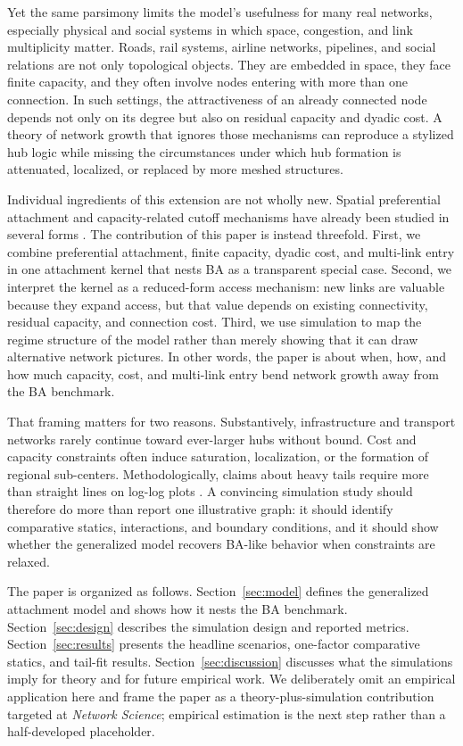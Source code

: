 \documentclass[11pt]{article}
\begin{document}
Yet the same parsimony limits the model's usefulness for many real networks, especially physical and social systems in which space, congestion, and link multiplicity matter. Roads, rail systems, airline networks, pipelines, and social relations are not only topological objects. They are embedded in space, they face finite capacity, and they often involve nodes entering with more than one connection. In such settings, the attractiveness of an already connected node depends not only on its degree but also on residual capacity and dyadic cost. A theory of network growth that ignores those mechanisms can reproduce a stylized hub logic while missing the circumstances under which hub formation is attenuated, localized, or replaced by more meshed structures.

Individual ingredients of this extension are not wholly new. Spatial preferential attachment and capacity-related cutoff mechanisms have already been studied in several forms \citep{barthelemy2011spatial,bianconi2001competition,krapivsky2001organization}. The contribution of this paper is instead threefold. First, we combine preferential attachment, finite capacity, dyadic cost, and multi-link entry in one attachment kernel that nests BA as a transparent special case. Second, we interpret the kernel as a reduced-form access mechanism: new links are valuable because they expand access, but that value depends on existing connectivity, residual capacity, and connection cost. Third, we use simulation to map the regime structure of the model rather than merely showing that it can draw alternative network pictures. In other words, the paper is about when, how, and how much capacity, cost, and multi-link entry bend network growth away from the BA benchmark.

That framing matters for two reasons. Substantively, infrastructure and transport networks rarely continue toward ever-larger hubs without bound. Cost and capacity constraints often induce saturation, localization, or the formation of regional sub-centers. Methodologically, claims about heavy tails require more than straight lines on log-log plots \citep{clauset2009power}. A convincing simulation study should therefore do more than report one illustrative graph: it should identify comparative statics, interactions, and boundary conditions, and it should show whether the generalized model recovers BA-like behavior when constraints are relaxed.

The paper is organized as follows. Section~\ref{sec:model} defines the generalized attachment model and shows how it nests the BA benchmark. Section~\ref{sec:design} describes the simulation design and reported metrics. Section~\ref{sec:results} presents the headline scenarios, one-factor comparative statics, and tail-fit results. Section~\ref{sec:discussion} discusses what the simulations imply for theory and for future empirical work. We deliberately omit an empirical application here and frame the paper as a theory-plus-simulation contribution targeted at \emph{Network Science}; empirical estimation is the next step rather than a half-developed placeholder.
\end{document}
